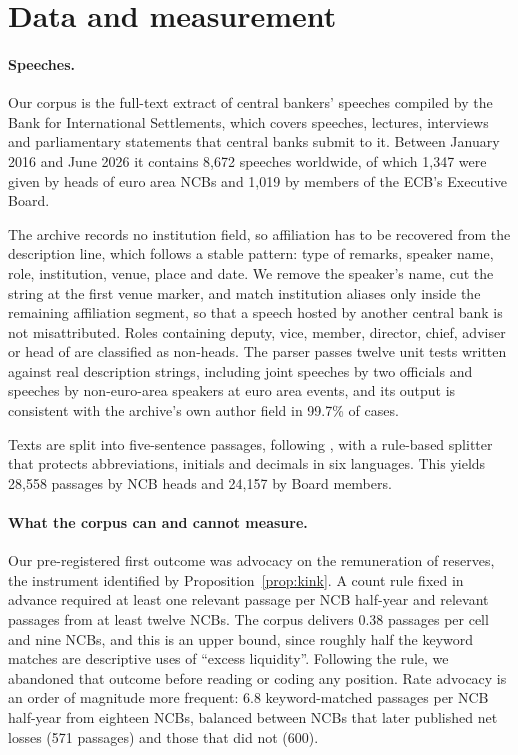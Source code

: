 \documentclass[11pt]{article}
\theoremstyle{plain}
\begin{document}
\section{Data and measurement}\label{sec:data}

\paragraph{Speeches.}
Our corpus is the full-text extract of central bankers' speeches compiled by the Bank for International Settlements, which covers speeches, lectures, interviews and parliamentary statements that central banks submit to it. Between January 2016 and June 2026 it contains 8{,}672 speeches worldwide, of which 1{,}347 were given by heads of euro area NCBs and 1{,}019 by members of the ECB's Executive Board.

The archive records no institution field, so affiliation has to be recovered from the description line, which follows a stable pattern: type of remarks, speaker name, role, institution, venue, place and date. We remove the speaker's name, cut the string at the first venue marker, and match institution aliases only inside the remaining affiliation segment, so that a speech hosted by another central bank is not misattributed. Roles containing deputy, vice, member, director, chief, adviser or head of are classified as non-heads. The parser passes twelve unit tests written against real description strings, including joint speeches by two officials and speeches by non-euro-area speakers at euro area events, and its output is consistent with the archive's own author field in 99.7\% of cases.

Texts are split into five-sentence passages, following \citet{heinemann2026}, with a rule-based splitter that protects abbreviations, initials and decimals in six languages. This yields 28{,}558 passages by NCB heads and 24{,}157 by Board members.

\paragraph{What the corpus can and cannot measure.}
Our pre-registered first outcome was advocacy on the remuneration of reserves, the instrument identified by Proposition~\ref{prop:kink}. A count rule fixed in advance required at least one relevant passage per NCB half-year and relevant passages from at least twelve NCBs. The corpus delivers 0.38 passages per cell and nine NCBs, and this is an upper bound, since roughly half the keyword matches are descriptive uses of ``excess liquidity''. Following the rule, we abandoned that outcome before reading or coding any position. Rate advocacy is an order of magnitude more frequent: 6.8 keyword-matched passages per NCB half-year from eighteen NCBs, balanced between NCBs that later published net losses (571 passages) and those that did not (600).
\end{document}
